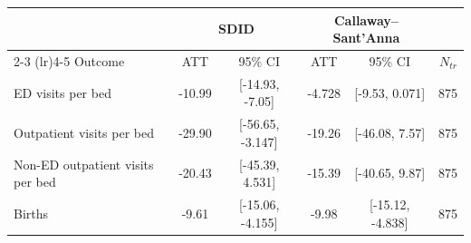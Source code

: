 \begin{tabular}{lccccr}
\toprule
 & \multicolumn{2}{c}{SDID} & \multicolumn{2}{c}{Callaway--Sant'Anna} & \\
\cmidrule(lr){2-3} \cmidrule(lr){4-5}
Outcome & ATT & 95\% CI & ATT & 95\% CI & $N_{tr}$ \\
\midrule
ED visits per bed & -10.99 & [-14.93, -7.05] & -4.728 & [-9.53, 0.071] & 875 \\
Outpatient visits per bed & -29.90 & [-56.65, -3.147] & -19.26 & [-46.08, 7.57] & 875 \\
Non-ED outpatient visits per bed & -20.43 & [-45.39, 4.531] & -15.39 & [-40.65, 9.87] & 875 \\
Births & -9.61 & [-15.06, -4.155] & -9.98 & [-15.12, -4.838] & 875 \\
\bottomrule
\end{tabular}
